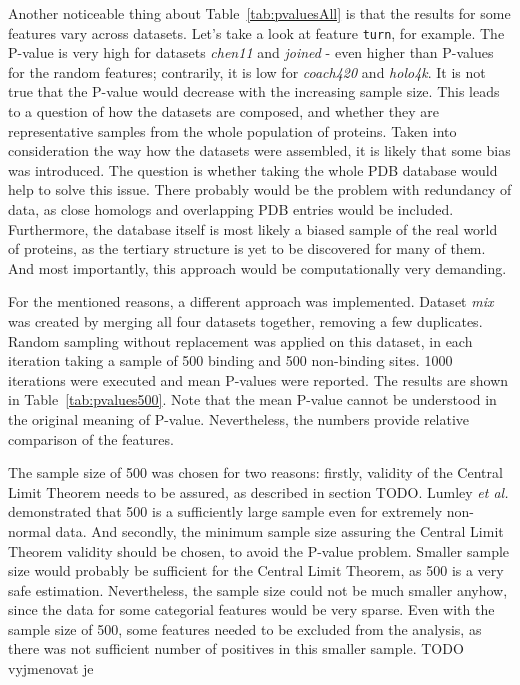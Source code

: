 Another noticeable thing about Table~\ref{tab:pvaluesAll} is that the results for some features vary across datasets. Let's take a look at feature \texttt{turn}, for example. The P-value is very high for datasets \textit{chen11} and \textit{joined} - even higher than P-values for the random features; contrarily, it is low for \textit{coach420} and \textit{holo4k}. It is not true that the P-value would decrease with the increasing sample size. This leads to a question of how the datasets are composed, and whether they are representative samples from the whole population of proteins. Taken into consideration the way how the datasets were assembled, it is likely that some bias was introduced. The question is whether taking the whole PDB database would help to solve this issue. There probably would be the problem with redundancy of data, as close homologs and overlapping PDB entries would be included. Furthermore, the database itself is most likely a biased sample of the real world of proteins, as the tertiary structure is yet to be discovered for many of them. And most importantly, this approach would be computationally very demanding.

For the mentioned reasons, a different approach was implemented. Dataset \textit{mix} was created by merging all four datasets together, removing a few duplicates. Random sampling without replacement was applied on this dataset, in each iteration taking a sample of 500 binding and 500 non-binding sites. 1000 iterations were executed and mean P-values were reported. The results are shown in Table~\ref{tab:pvalues500}. Note that the mean P-value cannot be understood in the original meaning of P-value. Nevertheless, the numbers provide relative comparison of the features.

The sample size of 500 was chosen for two reasons: firstly,  validity of the Central Limit Theorem needs to be assured, as described in section TODO. Lumley \textit{et al.} \cite{lumley} demonstrated that 500 is a sufficiently large sample even for extremely non-normal data. And secondly, the minimum sample size assuring the Central Limit Theorem validity should be chosen, to avoid the P-value problem. Smaller sample size would probably be sufficient for the Central Limit Theorem, as 500 is a very safe estimation. Nevertheless, the sample size could not be much smaller anyhow, since the data for some categorial features would be very sparse. Even with the sample size of 500, some features needed to be excluded from the analysis, as there was not sufficient number of positives in this smaller sample. TODO vyjmenovat je

